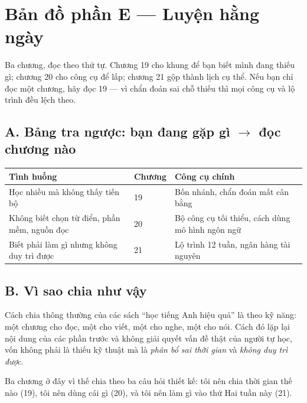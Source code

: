\documentclass[../english.tex]{subfiles}
\begin{document}
\section*{Bản đồ phần E --- Luyện hằng ngày}

\begin{tomtat}
Ba chương, đọc theo thứ tự. Chương 19 cho khung để bạn biết mình đang thiếu gì; chương 20 cho công cụ để lấp; chương 21 gộp thành lịch cụ thể. Nếu bạn chỉ đọc một chương, hãy đọc 19 --- vì chẩn đoán sai chỗ thiếu thì mọi công cụ và lộ trình đều lệch theo.
\end{tomtat}

\subsection*{A. Bảng tra ngược: bạn đang gặp gì \(\rightarrow\) đọc chương nào}
\begin{center}\footnotesize
\begin{tabularx}{\linewidth}{@{}L{5.6cm}L{2.0cm}Y@{}}
\toprule
\textbf{Tình huống} & \textbf{Chương} & \textbf{Công cụ chính}\\
\midrule
Học nhiều mà không thấy tiến bộ & 19 & Bốn nhánh, chẩn đoán mất cân bằng\\
Không biết chọn từ điển, phần mềm, nguồn đọc & 20 & Bộ công cụ tối thiểu, cách dùng mô hình ngôn ngữ\\
Biết phải làm gì nhưng không duy trì được & 21 & Lộ trình 12 tuần, ngân hàng tài nguyên\\
\bottomrule
\end{tabularx}
\end{center}

\subsection*{B. Vì sao chia như vậy}
Cách chia thông thường của các sách ``học tiếng Anh hiệu quả'' là theo kỹ năng: một chương cho đọc, một cho viết, một cho nghe, một cho nói. Cách đó lặp lại nội dung của các phần trước và không giải quyết vấn đề thật của người tự học, vốn không phải là thiếu kỹ thuật mà là \emph{phân bổ sai thời gian} và \emph{không duy trì được}.

Ba chương ở đây vì thế chia theo ba câu hỏi thiết kế: tôi nên chia thời gian thế nào (19), tôi nên dùng cái gì (20), và tôi nên làm gì vào thứ Hai tuần này (21).
\end{document}
